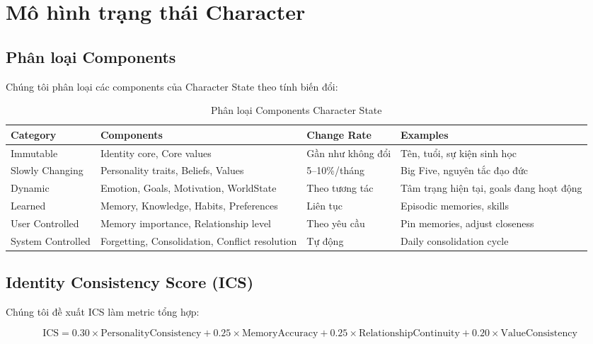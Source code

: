 \section{Mô hình trạng thái Character}

\subsection{Phân loại Components}

Chúng tôi phân loại các components của Character State theo tính biến đổi:

\begin{table}[H]
\centering
\caption{Phân loại Components Character State}
\label{tab:state-components}
\begin{tabular}{llll}
\toprule
\textbf{Category} & \textbf{Components} & \textbf{Change Rate} & \textbf{Examples} \\
\midrule
Immutable & Identity core, Core values & Gần như không đổi & Tên, tuổi, sự kiện sinh học \\
Slowly Changing & Personality traits, Beliefs, Values & 5--10\%/tháng & Big Five, nguyên tắc đạo đức \\
Dynamic & Emotion, Goals, Motivation, WorldState & Theo tương tác & Tâm trạng hiện tại, goals đang hoạt động \\
Learned & Memory, Knowledge, Habits, Preferences & Liên tục & Episodic memories, skills \\
User Controlled & Memory importance, Relationship level & Theo yêu cầu & Pin memories, adjust closeness \\
System Controlled & Forgetting, Consolidation, Conflict resolution & Tự động & Daily consolidation cycle \\
\bottomrule
\end{tabular}
\end{table}

\subsection{Identity Consistency Score (ICS)}

Chúng tôi đề xuất ICS làm metric tổng hợp:

\begin{equation}
\text{ICS} = 0.30 \times \text{PersonalityConsistency} + 0.25 \times \text{MemoryAccuracy} + 0.25 \times \text{RelationshipContinuity} + 0.20 \times \text{ValueConsistency}
\end{equation}

